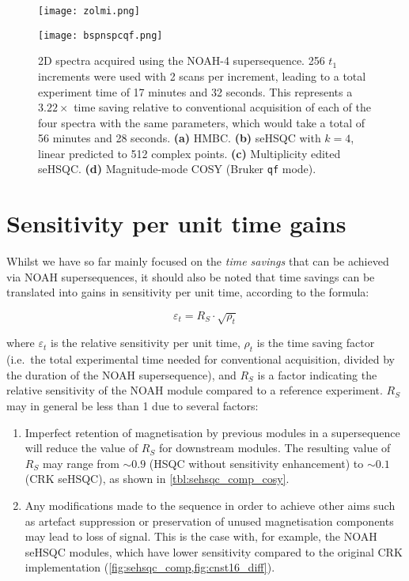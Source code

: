 \begin{figure}
    \centering
    \texttt{[image: zolmi.png]}\phantom{aaaaaa}

    \texttt{[image: bspnspcqf.png]}
    \caption{
        2D spectra acquired using the NOAH-4  supersequence.
        256 $t_1$ increments were used with 2 scans per increment, leading to a total experiment time of 17 minutes and 32 seconds.
        This represents a $3.22\times$ time saving relative to conventional acquisition of each of the four spectra with the same parameters, which would take a total of 56 minutes and 28 seconds.
        \textbf{(a)} HMBC.
        \textbf{(b)} \nitrogen{} seHSQC with $k = 4$, linear predicted to 512 complex points.
        \textbf{(c)} Multiplicity edited \carbon{} seHSQC.
        \textbf{(d)} Magnitude-mode COSY (Bruker \texttt{qf} mode).
        \zolmi{}
    }
    \label{fig:bspnspcqf}
\end{figure}

\section{Sensitivity per unit time gains}

Whilst we have so far mainly focused on the \textit{time savings} that can be achieved via NOAH supersequences, it should also be noted that time savings can be translated into gains in sensitivity per unit time, according to the formula:\autocite{Kupce2019JMR}

$$\varepsilon_t = R_S \cdot \sqrt{\rho_t}$$

where $\varepsilon_t$ is the relative sensitivity per unit time, $\rho_t$ is the time saving factor (i.e.\ the total experimental time needed for conventional acquisition, divided by the duration of the NOAH supersequence), and $R_S$ is a factor indicating the relative sensitivity of the NOAH module compared to a reference experiment.
$R_S$ may in general be less than 1 due to several factors:

\begin{enumerate}
    \item Imperfect retention of magnetisation by previous modules in a supersequence will reduce the value of $R_S$ for downstream modules.
        The resulting value of $R_S$ may range from $\sim 0.9$ (HSQC without sensitivity enhancement) to $\sim 0.1$ (CRK seHSQC), as shown in \cref{tbl:sehsqc_comp_cosy}.
    \item Any modifications made to the sequence in order to achieve other aims such as artefact suppression or preservation of unused magnetisation components may lead to loss of signal.
        This is the case with, for example, the NOAH seHSQC modules, which have lower sensitivity compared to the original CRK implementation (\cref{fig:sehsqc_comp,fig:cnst16_diff}).
\end{enumerate}

